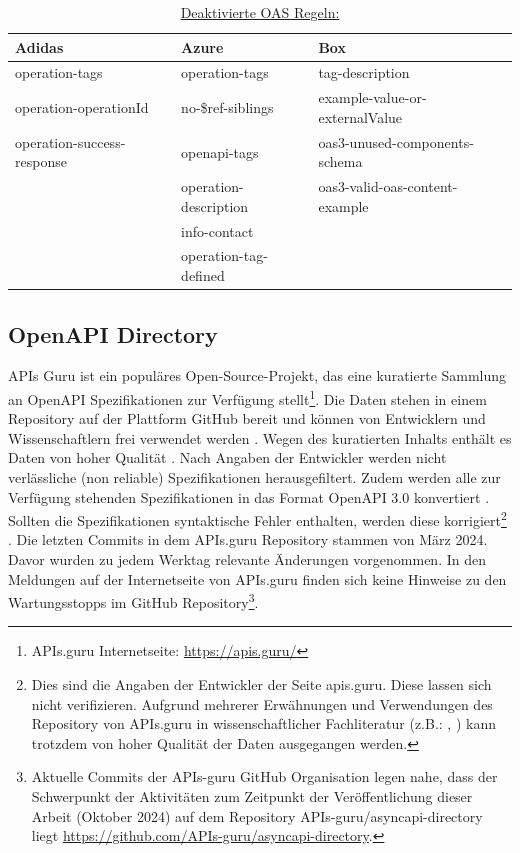   \begin{longtable}{lll}
    \caption{ \href{https://docs.stoplight.io/docs/spectral/4dec24461f3af-open-api-rules}{Deaktivierte OAS Regeln:}}
    \label{tab:DeactivatedRules}
    \endfirsthead
    \endhead
    \textbf{Adidas} & \textbf{Azure} & \textbf{Box} \\ \hline \hline
    operation-tags & operation-tags & tag-description \\ 
    operation-operationId & no-\$ref-siblings & example-value-or-externalValue \\ 
    operation-success-response & openapi-tags &  oas3-unused-components-schema \\ 
    & operation-description &  oas3-valid-oas-content-example \\ 
    & info-contact & \\ 
    & operation-tag-defined & \\ \hline\hline
  \end{longtable}


\subsection{OpenAPI Directory} \label{sec:apisguru}
APIs Guru ist ein populäres Open-Source-Projekt, das eine kuratierte Sammlung an OpenAPI Spezifikationen zur Verfügung stellt\footnote{APIs.guru Internetseite: \href{https://apis.guru/}{https://apis.guru/}}. Die Daten stehen in einem Repository auf der Plattform GitHub bereit und können von Entwicklern und Wissenschaftlern frei verwendet werden \parencite{serbout_apistic_2024}. Wegen des kuratierten Inhalts enthält es Daten von hoher Qualität \parencite{serbout_apistic_2024}\parencite{bogner_restruler_2024}. Nach Angaben der Entwickler werden nicht verlässliche (non reliable) Spezifikationen herausgefiltert. Zudem werden alle zur Verfügung stehenden Spezifikationen in das Format OpenAPI 3.0 konvertiert \parencite{apisguru_openapi_2024}. Sollten die Spezifikationen syntaktische Fehler enthalten, werden diese korrigiert\footnote{Dies sind die Angaben der Entwickler der Seite apis.guru. Diese lassen sich nicht verifizieren. Aufgrund mehrerer Erwähnungen und Verwendungen des Repository von APIs.guru in wissenschaftlicher Fachliteratur (z.B.: \parencite{serbout_apistic_2024}, \parencite{bogner_restruler_2024}) kann trotzdem von hoher Qualität der Daten ausgegangen werden.} \parencite{apisguru_apisguru_2024}. Die letzten Commits in dem APIs.guru Repository stammen von März 2024. Davor wurden zu jedem Werktag relevante Änderungen vorgenommen. In den Meldungen auf der Internetseite von APIs.guru finden sich keine Hinweise zu den Wartungsstopps im GitHub Repository\footnote{Aktuelle Commits der APIs-guru GitHub Organisation legen nahe, dass der Schwerpunkt der Aktivitäten zum Zeitpunkt der Veröffentlichung dieser Arbeit (Oktober 2024) auf dem Repository APIs-guru/asyncapi-directory liegt \href{https://github.com/APIs-guru/asyncapi-directory}{https://github.com/APIs-guru/asyncapi-directory}.}.


